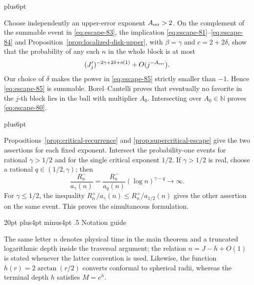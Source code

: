 \documentclass[12pt,reqno]{amsart}
\makeatletter
\def\section{\@startsection{section}{1}{0pt}%
  {20pt plus4pt minus4pt}
  {.5\linespacing}
  {\normalfont\bfseries}}
\theoremstyle{plain}
\theoremstyle{definition}
\theoremstyle{remark}
\renewenvironment{proof}[1][\proofname]{%
  \par
  \pushQED{\qed}%
  \normalfont
  \topsep6pt plus6pt\relax
  \trivlist
  \item[\hskip\labelsep\slshape #1\@addpunct{.}]%
  \ignorespaces
}{%
  \popQED
  \endtrivlist
  \@endpefalse
}
\DeclareRobustCommand{\qed}{%
  \leavevmode\unskip\penalty9999\hbox{}\nobreak
  \ifmmode
    \makebox[0pt][l]{\qquad\hbox{\qedsymbol}}%
  \else
    \qquad\hbox{\qedsymbol}%
  \fi
}
\renewcommand{\qedsymbol}{\rule[.47pt]{4pt}{6pt}}
\numberwithin{equation}{section}
\makeatother
\begin{document}
\begin{proof}
Choose independently an upper-error exponent \(A_{\rm err}>2\).
On the complement of the summable event in \eqref{eq:escape-83}, the implication
\eqref{eq:escape-81}--\eqref{eq:escape-84} and Proposition~\ref{prop:localized-disk-upper}, with
\(\beta=\gamma\) and \(c=2+2\delta\), show that the probability of any
such \(n\) in the whole block is at most
\begin{equation}
(J'_j)^{-2\gamma+2\delta+o(1)}+O(j^{-A_{\rm err}}).     \label{eq:escape-85}
\end{equation}
Our choice of \(\delta\) makes the power in \eqref{eq:escape-85} strictly smaller than
\(-1\).  Hence \eqref{eq:escape-85} is summable.  Borel--Cantelli proves that eventually
no favorite in the \(j\)-th block lies in the ball with multiplier \(A_0\).
Intersecting over \(A_0\in\mathbb N\) proves \eqref{eq:escape-80}.
\end{proof}


\begin{proof}[Proof of Theorem~\ref{main:precise-escape-rate}]
Propositions~\ref{prop:critical-recurrence} and
\ref{prop:supercritical-escape} give the two assertions for each fixed
exponent. Intersect the probability-one events for rational
$\gamma>1/2$ and for the single critical exponent $1/2$.
If $\gamma>1/2$ is real, choose a rational $q\in(1/2,\gamma)$; then
\[
 \frac{R_n^-}{a_\gamma(n)}
 =\frac{R_n^-}{a_q(n)}(\log n)^{\gamma-q}\longrightarrow\infty.
\]
For $\gamma\le1/2$, the inequality
$R_n^+/a_\gamma(n)\le R_n^+/a_{1/2}(n)$ gives the other assertion on the
same event. This proves the simultaneous formulation.
\end{proof}


\clearpage
\appendix
\section{Notation guide}\label{sec:notation}

The same letter $n$ denotes physical time in the main theorem and a
truncated logarithmic depth inside the traversal argument; the relation
$n=J-h+O(1)$ is stated whenever the latter convention is used. Likewise,
the function $h(r)=2\arctan(r/2)$ converts conformal to spherical radii,
whereas the terminal depth $h$ satisfies $M=e^h$.
\end{document}

